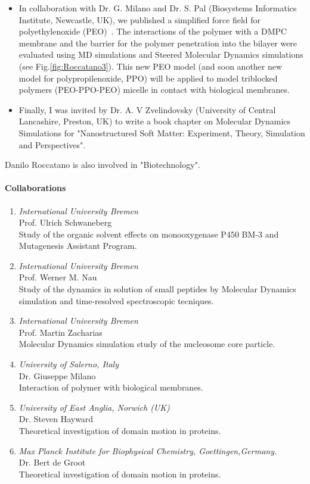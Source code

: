 \begin{itemize}
\item{} In collaboration with Dr. G. Milano and Dr. S. Pal (Biosystems Informatics 
Institute, Newcastle, UK), we published a simplified force 
field for polyethylenoxide (PEO)~\cite{Pal06}. The interactions of the polymer 
with a DMPC membrane and the barrier for the polymer penetration into the 
bilayer were evaluated using MD simulations and Steered Molecular Dynamics simulations 
(see Fig.\ref{fig:Roccatano3}). This new PEO model (and soon another 
new model for polypropilenoxide, PPO) will be applied to model triblocked polymers  
(PEO-PPO-PEO) micelle in contact with biological membranes. 

\item{} Finally, I was invited by Dr. A. V Zvelindovsky (University of Central Lancashire, Preston, UK)  
to write a book chapter on Molecular Dynamics Simulations for "Nanostructured Soft 
Matter: Experiment, Theory, Simulation and Perspectives". \cite{Roccatano06b}

\end{itemize}

\nocite{Schenk06,Wong06,Wong06b,Roccatano06a}
Danilo Roccatano is also involved in "Biotechnology".


\paragraph{Collaborations}
\begin{enumerate}
\item {\sl International University Bremen} \\ Prof. Ulrich Schwaneberg \\ Study of 
the organic solvent effects on
monooxygenase P450 BM-3 and Mutagenesis Assistant Program.
\item {\sl International University Bremen} \\ Prof. Werner M. Nau \\ Study of the 
dynamics in solution of small 
peptides by Molecular Dynamics simulation and time-resolved spectroscopic 
tecniques.
\item {\sl International University Bremen} \\ Prof. Martin Zacharias \\ Molecular 
Dynamics simulation study of the nucleosome core particle.
\item {\sl University of Salerno, Italy} \\ Dr. Giuseppe Milano \\ Interaction of 
polymer with biological membranes.
\item {\sl University of East Anglia, Norwich (UK)} \\ Dr. Steven Hayward \\ Theoretical 
investigation of domain motion in proteins.
\item {\sl Max Planck Institute for Biophysical Chemistry, Goettingen,Germany. } \\ 
Dr. Bert de Groot \\ Theoretical investigation of domain motion in proteins.
\end{enumerate}



